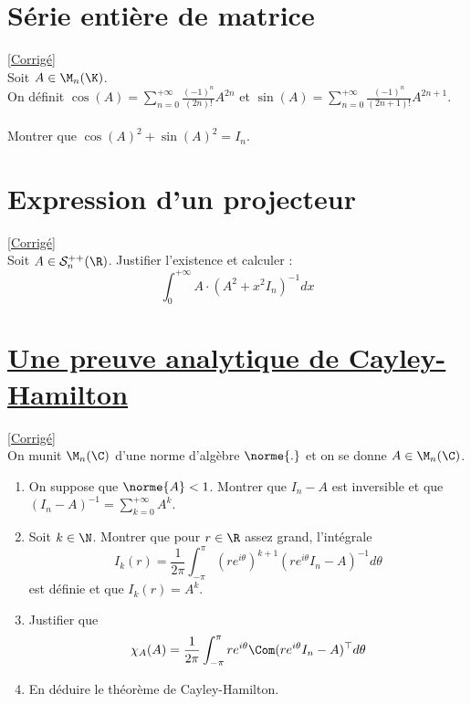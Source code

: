 \documentclass{book}
\begin{document}
\section{Série entière de matrice }
\textcolor{blue}{\hyperref[sec:serie-entiere-de-matrice-etoile2]{[Corrigé]}}\\
\label{Série entière de matrice}
Soit $A\in\M_n(\K)$.
\\On définit $\cos(A)=\displaystyle\sum\limits_{n=0}^{+\infty} \frac{(-1)^n}{(2n)!}A^{2n}$ et $\sin(A)=\displaystyle\sum\limits_{n=0}^{+\infty} \frac{(-1)^n}{(2n+1)!}A^{2n+1}$.
\\\\Montrer que $\cos(A)^2+\sin(A)^2=I_n$.

\section{Expression d'un projecteur}
\textcolor{blue}{\hyperref[sec:expression-dun-projecteur]{[Corrigé]}}\\
\label{Expression d'un projecteur}
Soit $A\in \mathcal S_n^{++}(\R)$. Justifier l'existence et calculer :
$$\int_0^{+\infty}A\cdot(A^2+x^2I_n)^{-1}dx$$

\section{\underline{Une preuve analytique de Cayley-Hamilton} }
\textcolor{blue}{\hyperref[sec:une-preuve-analytique-de-cayley-hamilton]{[Corrigé]}}\\
\label{Une preuve analytique de Cayley-Hamilton}
On munit $\M_n(\C)$ d'une norme d'algèbre $\norme{.}$ et on se donne $A\in \M_n(\C)$.
\begin{enumerate}
	\item On suppose que $\norme{A}<1$. Montrer que $I_n-A$ est inversible et que $(I_n-A)^{-1}=\displaystyle\sum_{k=0}^{+\infty}A^k$.
	\item Soit $k\in \N$. Montrer que pour $r\in \R$ assez grand, l'intégrale
	$$I_k(r)=\frac{1}{2\pi}\int_{-\pi}^{\pi}\left(re^{i\theta}\right)^{k+1}\left(re^{i\theta}I_n-A\right)^{-1}d\theta$$
	est définie et que $I_k(r)=A^k$.
	\item Justifier que
	$$\chi_A(A)=\frac{1}{2\pi}\int_{-\pi}^{\pi}re^{i\theta}\Com(re^{i\theta}I_n-A)^\top d\theta$$
	\item En déduire le théorème de Cayley-Hamilton.
\end{enumerate}
\end{document}
